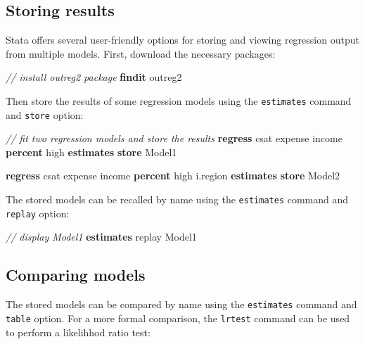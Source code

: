 \documentclass[
]{book}
\newenvironment{Shaded}{\begin{snugshade}}{\end{snugshade}}
\newcommand{\CommentTok}[1]{\textcolor[rgb]{0.56,0.35,0.01}{\textit{#1}}}
\newcommand{\FunctionTok}[1]{\textcolor[rgb]{0.00,0.00,0.00}{#1}}
\newcommand{\KeywordTok}[1]{\textcolor[rgb]{0.13,0.29,0.53}{\textbf{#1}}}
\newcommand{\NormalTok}[1]{#1}
\begin{document}
\hypertarget{storing-results}{%
\subsection{Storing results}\label{storing-results}}

Stata offers several user-friendly options for storing and viewing regression output from multiple models. First, download the necessary packages:

\begin{Shaded}
\begin{Highlighting}[]
\CommentTok{// install outreg2 package}
\KeywordTok{findit}\NormalTok{ outreg2}
\end{Highlighting}
\end{Shaded}

Then store the results of some regression models using the \texttt{estimates} command and \texttt{store} option:

\begin{Shaded}
\begin{Highlighting}[]
\CommentTok{// fit two regression models and store the results}
\KeywordTok{regress}\NormalTok{ csat expense income }\KeywordTok{percent}\NormalTok{ high}
\KeywordTok{estimates} \KeywordTok{store}\NormalTok{ Model1}
  
\KeywordTok{regress}\NormalTok{ csat expense income }\KeywordTok{percent}\NormalTok{ high i.region}
\KeywordTok{estimates} \KeywordTok{store}\NormalTok{ Model2}
\end{Highlighting}
\end{Shaded}

The stored models can be recalled by name using the \texttt{estimates} command and \texttt{replay} option:

\begin{Shaded}
\begin{Highlighting}[]
\CommentTok{// display Model1}
\KeywordTok{estimates} \FunctionTok{replay}\NormalTok{ Model1}
\end{Highlighting}
\end{Shaded}

\hypertarget{comparing-models-1}{%
\subsection{Comparing models}\label{comparing-models-1}}

The stored models can be compared by name using the \texttt{estimates} command and \texttt{table} option. For a more formal comparison, the \texttt{lrtest} command can be used to perform a likelihhod ratio test:
\end{document}

